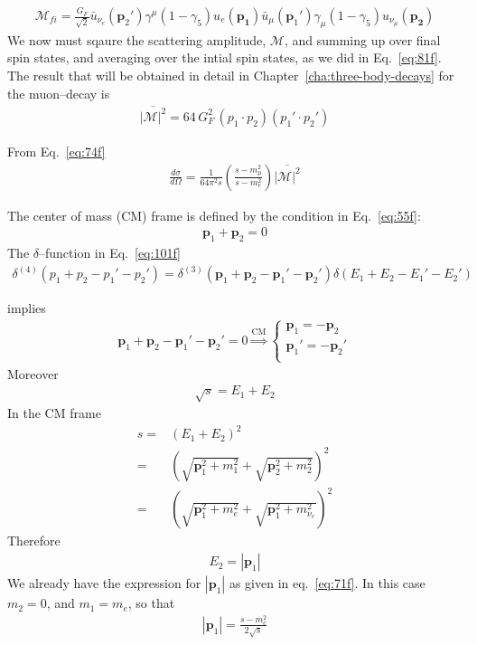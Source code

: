 \begin{align}
  \mathcal{M}_{fi}=\frac{G_F}{\sqrt{2}}
\bar{u}_{\nu_e}(\mathbf{p}_2')\gamma^\mu(1-\gamma_5)u_e(\mathbf{p_1})
\bar{u}_\mu(\mathbf{p}_1')\gamma_\mu(1-\gamma_5)u_{\nu_\mu}(\mathbf{p_2})
\end{align}
We now must sqaure the scattering amplitude, $\mathcal{M}$, and summing up over final spin states, and averaging over the intial spin states, as we did in Eq.~\eqref{eq:81f}. The result that will be obtained in detail in Chapter~\ref{cha:three-body-decays} for the muon--decay is
\begin{align}
  \label{eq:102f}
  \overline{|\mathcal{M}|^2}=64\,G_F^2\,(p_1\cdot p_2)(p_1'\cdot p_2')
\end{align}

From Eq.~\eqref{eq:74f}
\begin{align}
  \label{eq:103f}
  \frac{d\sigma}{d\Omega}=\frac{1}{64\pi^2s}\left(\frac{s-m_\mu^2}{s-m_e^2}\right)\overline{|\mathcal{M}|^2}
\end{align}

The center of mass (CM) frame is defined by the condition in Eq.~\eqref{eq:55f}:
\begin{align}
  \mathbf{p}_1+\mathbf{p}_2=0
\end{align}
The $\delta$--function in Eq.~\eqref{eq:101f}
\begin{align}
  \delta^{(4)}(p_1+p_2-p_1'-p_2')=\delta^{(3)}(\mathbf{p}_1+\mathbf{p}_2-\mathbf{p}_1'-\mathbf{p}_2')
\delta(E_1+E_2-E_1'-E_2')
\end{align}

implies
\begin{align}
  \label{eq:157f}
  \mathbf{p}_1+\mathbf{p}_2-\mathbf{p}_1'-\mathbf{p}_2'=0 \overset{\text{CM}}{\Rightarrow}
  \begin{cases}
    \mathbf{p}_1=-\mathbf{p}_2\\
    \mathbf{p}_1'=-\mathbf{p}_2'\\
  \end{cases}
\end{align}
Moreover
\begin{align}
  \sqrt{s}=E_1+E_2
\end{align}
In the CM frame
\begin{align}
\label{eq:104f}
s=&\left(E_1+E_2\right)^2\nonumber\\
=&\left(\sqrt{\mathbf{p}_1^2+m_1^2}+\sqrt{\mathbf{p}_2^2+m_2^2}\right)^2\nonumber\\
=&\left(\sqrt{\mathbf{p}_1^2+m_e^2}+\sqrt{\mathbf{p}_1^2+m_{\nu_e}^2}\right)^2
\end{align}
Therefore
\begin{align}
  \label{eq:105f}
  E_2=|\mathbf{p}_1|
\end{align}
We already have the expression for $|\mathbf{p}_1|$ as given in eq.~\eqref{eq:71f}. In this case $m_2=0$, and $m_1=m_e$, so that
\begin{align}
  \label{eq:158f}
  |\mathbf{p}_1|=\frac{s-m_e^2}{2\sqrt{s}}
\end{align}

